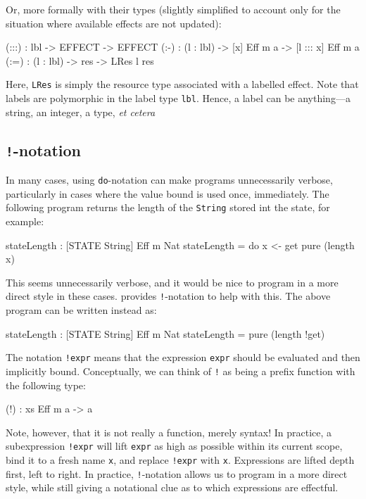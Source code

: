 \noindent
Or, more formally with their types (slightly simplified to account only for the situation where available effects are not updated):

\begin{code}
(:::) : lbl -> EFFECT -> EFFECT
(:-)  : (l : lbl) -> { [x] } Eff m a -> { [l ::: x] } Eff m a
(:=)  : (l : lbl) -> res -> LRes l res
\end{code}

\noindent
Here, \texttt{LRes} is simply the resource type associated with a labelled effect.
Note that labels are polymorphic in the label type \texttt{lbl}. 
Hence, a label can be anything---a string, an integer, a type, \emph{et cetera}

\subsection{\texttt{!}-notation}

In many cases, using \texttt{do}-notation can make programs unnecessarily verbose, particularly in cases where the value bound is used once, immediately.
The following program returns the length of the \texttt{String} stored int the state, for example:

\begin{code}
stateLength : { [STATE String] } Eff m Nat
stateLength = do x <- get
                 pure (length x)
\end{code}

\noindent
This seems unnecessarily verbose, and it would be nice to program in a more direct style in these cases.
\Idris{} provides \texttt{!}-notation to help with this.
The above program can be written instead as:

\begin{code}
stateLength : { [STATE String] } Eff m Nat
stateLength = pure (length !get)
\end{code}

\noindent
The notation \texttt{!expr} means that the expression \texttt{expr} should be evaluated and then implicitly bound.
Conceptually, we can think of \texttt{!} as being a prefix function with the following type:

\begin{code}
(!) : { xs } Eff m a -> a
\end{code}

\noindent
Note, however, that it is not really a function, merely syntax!
In practice, a subexpression \texttt{!expr} will lift \texttt{expr} as high as possible within its current scope, bind it to a fresh name \texttt{x}, and replace \texttt{!expr} with \texttt{x}.
Expressions are lifted depth first, left to right.
In practice, \texttt{!}-notation allows us to program in a more direct style, while still giving a notational clue as to which expressions are effectful.

